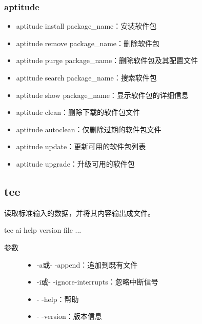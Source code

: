 \documentclass[letterpaper,10pt,english]{sphinxmanual}
\begin{document}
\subsubsection{aptitude}
\label{\detokenize{linux/02_more:aptitude}}\begin{itemize}
\item {} 
aptitude install package\_name：安装软件包

\item {} 
aptitude remove package\_name：删除软件包

\item {} 
aptitude purge package\_name：删除软件包及其配置文件

\item {} 
aptitude search package\_name：搜索软件包

\item {} 
aptitude show package\_name：显示软件包的详细信息

\item {} 
aptitude clean：删除下载的软件包文件

\item {} 
aptitude autoclean：仅删除过期的软件包文件

\item {} 
aptitude update：更新可用的软件包列表

\item {} 
aptitude upgrade：升级可用的软件包

\end{itemize}


\subsection{tee}
\label{\detokenize{linux/02_more:tee}}
读取标准输入的数据，并将其内容输出成文件。

%
\begin{sphinxVerbatim}[commandchars=\\\{\}]
tee \PYG{o}{[}\PYGZhy{}ai\PYG{o}{]} \PYG{o}{[}\PYGZhy{}\PYGZhy{}help\PYG{o}{]} \PYG{o}{[}\PYGZhy{}\PYGZhy{}version\PYG{o}{]} \PYG{o}{[}file ...\PYG{o}{]}
\end{sphinxVerbatim}
\begin{description}
\item[{参数}] \leavevmode\begin{itemize}
\item {} 
-a或- -append：追加到既有文件

\item {} 
-i或- -ignore-interrupts：忽略中断信号

\item {} 
- -help：帮助

\item {} 
- -version：版本信息

\end{itemize}

\end{description}
\end{document}
